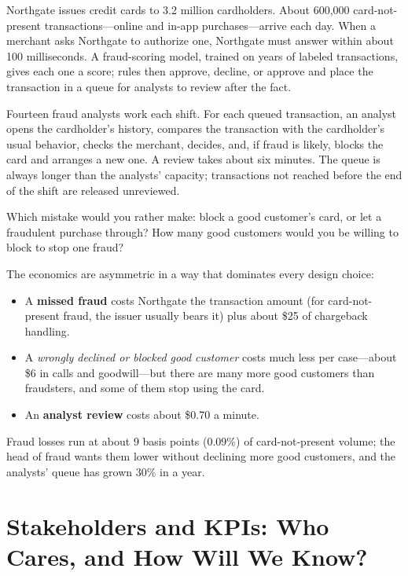 Northgate issues credit cards to 3.2 million cardholders. About 600{,}000 card-not-present transactions---online and in-app purchases---arrive each day. When a merchant asks Northgate to authorize one, Northgate must answer within about 100 milliseconds. A fraud-scoring model, trained on years of labeled transactions, gives each one a score; rules then approve, decline, or approve and place the transaction in a queue for analysts to review after the fact.

Fourteen fraud analysts work each shift. For each queued transaction, an analyst opens the cardholder's history, compares the transaction with the cardholder's usual behavior, checks the merchant, decides, and, if fraud is likely, blocks the card and arranges a new one. A review takes about six minutes. The queue is always longer than the analysts' capacity; transactions not reached before the end of the shift are released unreviewed.

\begin{thinkabout}
Which mistake would you rather make: block a good customer's card, or let a fraudulent purchase through? How many good customers would you be willing to block to stop one fraud?
\end{thinkabout}

The economics are asymmetric in a way that dominates every design choice:
\begin{itemize}[itemsep=1pt]
  \item A \textbf{missed fraud} costs Northgate the transaction amount (for card-not-present fraud, the issuer usually bears it) plus about \$25 of chargeback handling.
  \item A \emph{wrongly declined or blocked good customer} costs much less per case---about \$6 in calls and goodwill---but there are many more good customers than fraudsters, and some of them stop using the card.
  \item An \textbf{analyst review} costs about \$0.70 a minute.
\end{itemize}

Fraud losses run at about 9 basis points (0.09\%) of card-not-present volume; the head of fraud wants them lower without declining more good customers, and the analysts' queue has grown 30\% in a year.

\section{Stakeholders and KPIs: Who Cares, and How Will We Know?}
\label{sec:fr-kpis}

